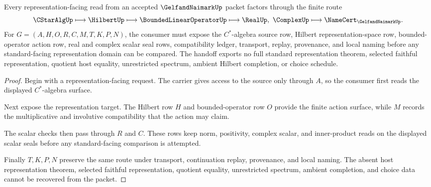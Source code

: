 \begin{theorem}
\label{thm:gelfand-naimark-representation-handoff}
Every representation-facing read from an accepted $\GelfandNaimarkUp$ packet factors through the finite route
$$
\CStarAlgUp \longmapsto \HilbertUp \longmapsto
\BoundedLinearOperatorUp \longmapsto \RealUp,\ \ComplexUp
\longmapsto \NameCert_{\GelfandNaimarkUp}.
$$
For $G=(A,H,O,R,C,M,T,K,P,N)$, the consumer must expose the $C^*$-algebra source row, Hilbert representation-space row, bounded-operator action row, real and complex scalar seal rows, compatibility ledger, transport, replay, provenance, and local naming before any standard-facing representation domain can be compared. The handoff exports no full standard representation theorem, selected faithful representation, quotient host equality, unrestricted spectrum, ambient Hilbert completion, or choice schedule.
\end{theorem}
\begin{proof}
Begin with a representation-facing request. The carrier gives access to the source only through $A$, so the consumer first reads the displayed $C^*$-algebra surface.

Next expose the representation target. The Hilbert row $H$ and bounded-operator row $O$ provide the finite action surface, while $M$ records the multiplicative and involutive compatibility that the action may claim.

The scalar checks then pass through $R$ and $C$. These rows keep norm, positivity, complex scalar, and inner-product reads on the displayed scalar seals before any standard-facing comparison is attempted.

Finally $T,K,P,N$ preserve the same route under transport, continuation replay, provenance, and local naming. The absent host representation theorem, selected faithful representation, quotient equality, unrestricted spectrum, ambient completion, and choice data cannot be recovered from the packet.
\end{proof}



